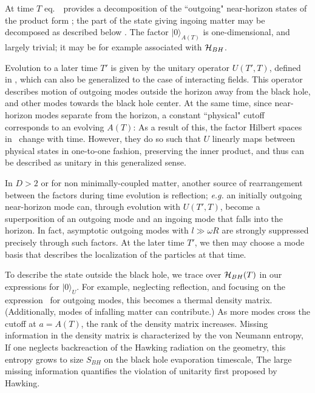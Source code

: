At time $T$ eq.~\sqopversc\ provides a decomposition of the ``outgoing" near-horizon states of the product form \hprod; the part of the state giving ingoing matter may be decomposed as described below \kruskbasis.  The factor $|0\rangle_{A(T)}$ is one-dimensional, and largely trivial; it may be for example associated with ${\cal H}_{BH}$.

Evolution to a later time $T'$ is given by the unitary operator $U(T',T)$, defined in \unitop, which can also be generalized to the case of interacting fields.  This operator describes motion of outgoing modes outside the horizon away from the black hole, and other modes towards the black hole center.  At the same time, since near-horizon modes separate from the horizon, a constant ``physical" cutoff corresponds to an evolving $A(T)$:
%
\eqn{}
%
As a result of this, the factor Hilbert spaces in \hprod\ change with time.  However, they do so such that $U$ linearly maps between physical states in one-to-one fashion, preserving the inner product, and thus can be described as unitary in this generalized sense.

In $D>2$ or for non minimally-coupled matter, another source of rearrangement between the factors during time evolution is reflection; {\it e.g.} an initially outgoing near-horizon mode can, through evolution with $U(T',T)$, become a superposition of an outgoing mode and an ingoing mode that falls into the horizon.  In fact, asymptotic outgoing modes with $l\gg \omega R$ are strongly suppressed precisely through such factors.  At the later time $T'$, we then may choose a mode basis that describes the localization of the particles at that time.  


To describe the state outside the black hole, we trace over ${\cal H}_{BH}(T)$ in our expressions for $|0\rangle_U$.  For example, neglecting reflection, and focusing on the expression \statepack\ for outgoing modes, this becomes
%
\eqn{}
%
a thermal density matrix.  (Additionally, modes of infalling matter can contribute.)  As more modes cross the cutoff at $a=A(T)$, the rank of the density matrix increases. Missing information in the density matrix is characterized by the von Neumann entropy,
%
\eqn{}
%
If one neglects backreaction of the Hawking radiation on the geometry, this entropy grows to size $S_{BH}$ on the black hole evaporation timescale, 
%
\eqn{}
%
The large missing information quantifies the violation of unitarity first proposed by Hawking.






